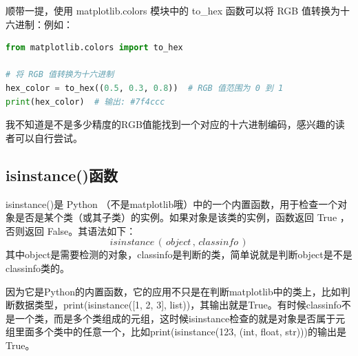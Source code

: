 \documentclass[12pt]{article}
\begin{document}
顺带一提，使用 matplotlib.colors 模块中的 to\_hex 函数可以将 RGB 值转换为十六进制：例如：
\begin{lstlisting}[language=Python]
from matplotlib.colors import to_hex

# 将 RGB 值转换为十六进制
hex_color = to_hex((0.5, 0.3, 0.8))  # RGB 值范围为 0 到 1
print(hex_color)  # 输出: #7f4ccc
\end{lstlisting}
我不知道是不是多少精度的RGB值能找到一个对应的十六进制编码，感兴趣的读者可以自行尝试。


\newpage
\subsection{isinstance()函数}\label{isinstance()函数}
 isinstance()是 Python （不是matplotlib哦）中的一个内置函数，用于检查一个对象是否是某个类（或其子类）的实例。如果对象是该类的实例，函数返回   True  ，否则返回   False。其语法如下：
\[isinstance\,(\,object\,,\, classinfo\,)\]
其中object是需要检测的对象，classinfo是判断的类，简单说就是判断object是不是classinfo类的。

因为它是Python的内置函数，它的应用不只是在判断matplotlib中的类上，比如判断数据类型，print(isinstance([1, 2, 3], list))，其输出就是True。有时候classinfo不是一个类，而是多个类组成的元组，这时候isinstance检查的就是对象是否属于元组里面多个类中的任意一个，比如print(isinstance(123, (int, float, str)))的输出是True。
\end{document}
